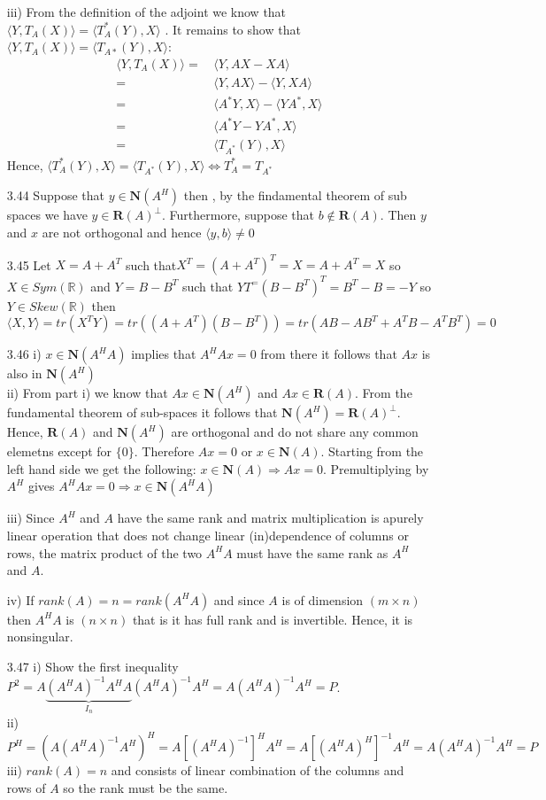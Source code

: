\documentclass[letterpaper,12pt]{article}
\theoremstyle{definition}
\begin{document}
\begin{enumerate}
iii)
From the definition of the adjoint we know that $\langle Y, T_A(X) \rangle = \langle T_A^*(Y), X \rangle$ . It remains to show that $ \langle Y, T_A(X) \rangle = \langle T_{A*}(Y), X\rangle$:
\begin{align*}
\langle Y, T_A(X) \rangle  =&\, \langle Y, AX-XA\rangle\\
=& \, \langle Y, AX \rangle - \langle Y, XA \rangle\\
=&\, \langle A^*Y, X \rangle - \langle YA^*, X\rangle\\
=&\, \langle A^*Y-YA^*, X\rangle\\
=&\, \langle T_{A^*}(Y), X \rangle
\end{align*}
Hence, $\langle T_A^*(Y), X \rangle = \langle T_{A^*}(Y), X \rangle \iff T_A^* = T_{A^*}$ 
\item[3.44]
Suppose that  $y \in \mathbf{N}(A^H)$ then , by the findamental theorem of sub spaces we have $y \in \mathbf{R}(A)^{\perp}$. Furthermore, suppose that $b \not\in   \mathbf{R}(A)$. Then $y$  and $x$  are not orthogonal and hence $\langle y, b\rangle  \neq 0$

\item[3.45]
Let $X=A+A^T$ such that$X^T=(A+A^T)^T=X=A+A^T=X$ so $ X \in Sym(\mathbb{R})$ and $Y=B-B^T$ such that $YT^=(B-B^T)^T=B^T-B=-Y$  so $Y \in Skew(\mathbb{R})$ then $\langle X, Y \rangle = tr(X^TY)= tr\left((A+A^T)(B-B^T) \right) =tr(AB-AB^T+A^TB-A^TB^T)=0 $
\item[3.46]
i) $x \in \mathbf{N}(A^HA)$ implies that $A^HAx=0$ from there it follows that $Ax$ is also in $\mathbf{N}(A^H)$\\

ii) From part i) we know that $Ax \in \mathbf{N}(A^H)$ and  $Ax \in \mathbf{R}(A)$. From the fundamental theorem of sub-spaces it follows that  $ \mathbf{N}(A^H) =  \mathbf{R}(A)^{\bot}$. Hence, $\mathbf{R}(A)$ and $ \mathbf{N}(A^H) $ are orthogonal and do not share any common elemetns except for $\{0\}$. Therefore $Ax=0$ or $x \in \mathbf{N}(A)$. Starting from the left hand side we get the following: $ x \in \mathbf{N}(A) \Rightarrow  Ax=0$. Premultiplying by $A^H$ gives $A^HAx=0 \Rightarrow x \in \mathbf{N}(A^HA)$  

iii) Since $A^H$ and $A$ have the same rank and matrix multiplication is apurely linear operation that does not change linear (in)dependence of columns or rows, the matrix product of the two $A^HA$ must have the same rank as $A^H$ and $A$.

iv) If  $rank(A) = n = rank(A^HA)$ and since $A$ is of dimension $( m\times n)$ then $A^HA$ is $( n\times n)$ that is it has full rank and is invertible. Hence, it is nonsingular.
\item[3.47]
i) Show the first inequality $P^2 = A \underbrace{(A^HA)^{-1}A^HA }_{I_n}
(A^HA)^{-1}A^H = A(A^HA)^{-1}A^H =P$.\\
ii)$P^H = (A(A^HA)^{-1}A^H)^H = A \left[(A^HA)^{-1}\right]^HA^H = A \left[(A^HA)^{H}\right]^{-1}A^H = A(A^HA)^{-1}A^H = P$ \\
iii) $rank(A)=n$ and consists of linear combination of the columns and rows of $A$ so the rank must be the same.


\end{enumerate}
\end{document}
